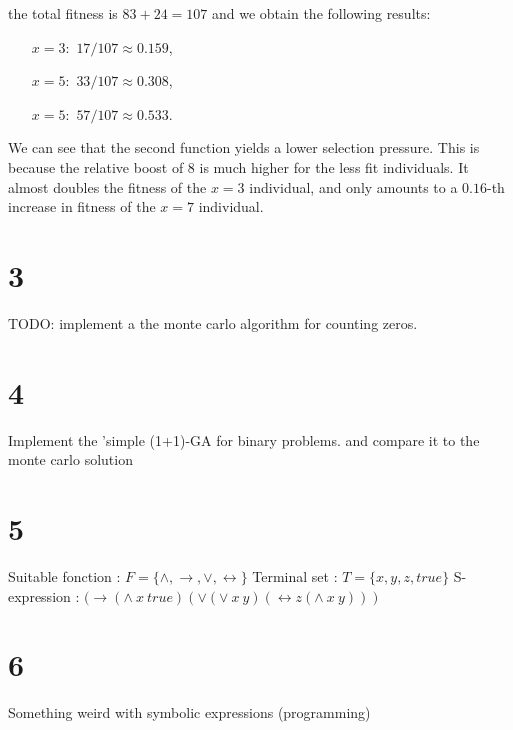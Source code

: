 \documentclass[10pt,a4paper]{article}
\begin{document}
	the total fitness is $83 + 24 = 107$ and
	we obtain the following results: 
	
		\begin{itemize}
		\item[$x=3:$] $17/107 \approx 0.159$,
		
		\item[$x=5:$] $33/107 \approx 0.308$,
		
		\item[$x=5:$] $57/107 \approx 0.533$.
		
	\end{itemize}

We can see that the second function yields a lower selection pressure. This is because the relative boost of 8 is much higher for the less fit individuals. It almost doubles the fitness of the $x=3$ individual, and only amounts to a $0.16$-th increase in fitness of the $x=7$ individual.

\section*{3}

TODO: implement a the monte carlo algorithm for counting zeros.

\section*{4}

Implement the 'simple (1+1)-GA for binary problems. and compare it to the monte carlo solution 

\section*{5}
Suitable fonction : $F = \{\wedge,\rightarrow, \vee,\leftrightarrow \}$
\newline Terminal set : $T = \{x,y,z,true\}$
\newline S-expression : $ (\rightarrow (\land\ x\ true)(\lor (\lor\ x\ y)(\leftrightarrow z(\land\ x\ y))) $

\section*{6}
Something weird with symbolic expressions (programming)
\end{document}
